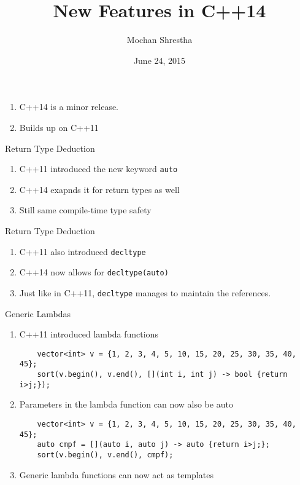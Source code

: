 \documentclass{beamer}
\title{New Features in C++14}
\author{Mochan Shrestha}
\institute{Ann Arbor C++ Meetup}
\date{June 24, 2015}
\begin{document}
\begin{frame}
\titlepage
\end{frame}

\begin{frame}[Introduction]
 \begin{enumerate}
  \item C++14 is a minor release.
  \item Builds up on C++11 
 \end{enumerate}

\end{frame}


\begin{frame}{Return Type Deduction}
\begin{enumerate}
  \item C++11 introduced the new keyword \texttt{auto}
  \item C++14 exapnds it for return types as well
  \item Still same compile-time type safety
\end{enumerate}
\end{frame}

\begin{frame}{Return Type Deduction}
 \begin{enumerate}
  \item C++11 also introduced \texttt{decltype}
  \item C++14 now allows for \texttt{decltype(auto)}
  \item Just like in C++11, \texttt{decltype} manages to maintain the references.
 \end{enumerate}
\end{frame}

\begin{frame}[fragile]{Generic Lambdas}
 \begin{enumerate}
  \item C++11 introduced lambda functions
  \begin{lstlisting}
	vector<int> v = {1, 2, 3, 4, 5, 10, 15, 20, 25, 30, 35, 40, 45};
	sort(v.begin(), v.end(), [](int i, int j) -> bool {return i>j;});
  \end{lstlisting}
  \item Parameters in the lambda function can now also be auto
  \begin{lstlisting}
	vector<int> v = {1, 2, 3, 4, 5, 10, 15, 20, 25, 30, 35, 40, 45};
	auto cmpf = [](auto i, auto j) -> auto {return i>j;};
	sort(v.begin(), v.end(), cmpf);   
  \end{lstlisting}

  \item Generic lambda functions can now act as templates
 \end{enumerate}  
\end{frame}
\end{document}
